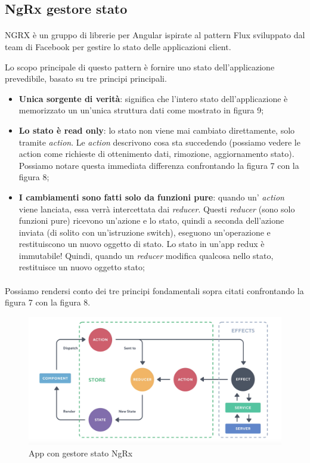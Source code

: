\subsection{NgRx gestore stato}
\paragraph{}
NGRX è un gruppo di librerie per Angular ispirate al pattern Flux sviluppato dal team di Facebook per gestire
lo stato delle applicazioni client.

Lo scopo principale di questo pattern è fornire uno stato dell'applicazione prevedibile, basato su tre principi principali.

\begin{itemize}
    \item \textbf{Unica sorgente di verità}: significa che l'intero stato dell'applicazione è memorizzato un un'unica struttura dati come mostrato in figura 9;
    \item \textbf{Lo stato è read only}: lo stato non viene mai cambiato direttamente, 
    solo tramite \textit{action}. Le \textit{action} descrivono cosa sta succedendo (possiamo vedere le action
    come richieste di ottenimento dati, rimozione, aggiornamento stato). Possiamo notare questa immediata differenza confrontando la figura 7 con la figura 8;
    \item \textbf{I cambiamenti sono fatti solo da funzioni pure}: quando un' \textit{action} viene lanciata, essa verrà
    intercettata dai \textit{reducer}.
    Questi \textit{reducer} (sono solo funzioni pure) ricevono un'azione e lo stato, quindi a seconda dell'azione inviata 
    (di solito con un'istruzione switch), eseguono un'operazione e restituiscono un nuovo oggetto di stato. 
    Lo stato in un'app redux è immutabile! Quindi, quando un \textit{reducer} modifica qualcosa nello stato, 
    restituisce un nuovo oggetto stato;
\end{itemize}

\paragraph{}
Possiamo rendersi conto dei tre principi fondamentali sopra citati confrontando la figura 7 con la figura 8.

\begin{figure}[h!]
    \centering  
    \caption{App con gestore stato NgRx}
    \includegraphics[scale=0.4]{img/cap2/ngrx}
\end{figure}
